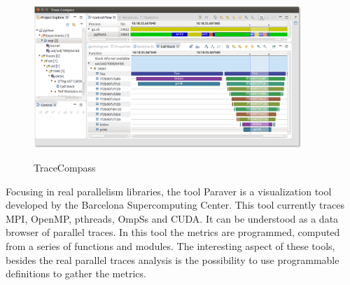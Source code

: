  \begin{figure}[h]
          \center
          \caption{TraceCompass}
            \includegraphics[width=0.90\textwidth]{figures/python-profile-ust-with-kernel.png}
            \label{fig:TraceCompass}
    \end{figure}
    
 
Focusing in real parallelism libraries, the tool Paraver \cite{paraver} is a visualization tool developed by the Barcelona Supercomputing Center. This tool currently traces MPI, OpenMP, pthreads, OmpSs and CUDA. It can be understood as a data browser of parallel traces. In this tool the metrics are programmed, computed from a series of functions and modules. The interesting aspect of  these tools, besides the real parallel traces analysis is the possibility to use programmable definitions to gather the metrics.\\
